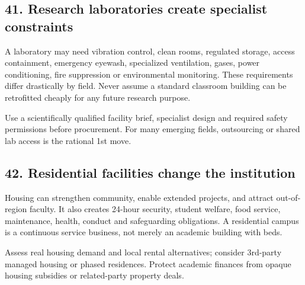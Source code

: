 \subsection{41. Research laboratories create specialist constraints}

A laboratory may need vibration control, clean rooms, regulated storage, access containment, emergency eyewash, specialized ventilation, gases, power conditioning, fire suppression or environmental monitoring. These requirements differ drastically by field. Never assume a standard classroom building can be retrofitted cheaply for any future research purpose.

Use a scientifically qualified facility brief, specialist design and required safety permissions before procurement. For many emerging fields, outsourcing or shared lab access is the rational 1st move.


\subsection{42. Residential facilities change the institution}

Housing can strengthen community, enable extended projects, and attract out-of-region faculty. It also creates 24-hour security, student welfare, food service, maintenance, health, conduct and safeguarding obligations. A residential campus is a continuous service business, not merely an academic building with beds.

Assess real housing demand and local rental alternatives; consider 3rd-party managed housing or phased residences. Protect academic finances from opaque housing subsidies or related-party property deals.
